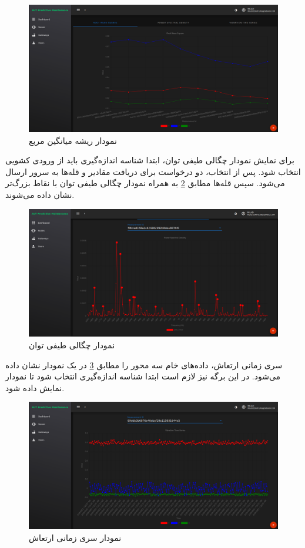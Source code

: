 \begin{figure}[!h]
\centering\includegraphics[scale=.38]{rms_chart.png}
\caption{نمودار ریشه میانگین مربع}\label{fig:rms_chart}
\end{figure}

برای نمایش نمودار چگالی طیفی توان، ابتدا شناسه اندازه‌گیری باید از ورودی کشویی انتخاب شود. پس از انتخاب، دو درخواست برای دریافت مقادیر  و قله‌ها به سرور ارسال می‌شود. سپس قله‌ها مطابق \cref{fig:psd_chart} به همراه نمودار چگالی طیفی توان با نقاط بزرگ‌تر نشان داده می‌شوند.

\begin{figure}[!h]
\centering\includegraphics[scale=.38]{psd_chart.png}
\caption{نمودار چگالی طیفی توان}\label{fig:psd_chart}
\end{figure}

سری زمانی ارتعاش، داده‌های خام سه محور را مطابق \cref{fig:vdt_chart} در یک نمودار نشان داده می‌شود. در این برگه نیز لازم است ابتدا شناسه اندازه‌گیری انتخاب شود تا نمودار نمایش داده شود.

\begin{figure}[!h]
\centering\includegraphics[scale=.38]{vdt_chart.png}
\caption{نمودار سری زمانی ارتعاش}\label{fig:vdt_chart}
\end{figure}


